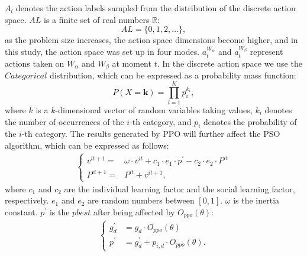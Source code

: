 \documentclass[review]{elsarticle}
\begin{document}
$A_{l}$ denotes the action labels sampled from the distribution of the discrete action space. $AL$ is a finite set of real numbers $\mathbb{R}$:
\begin{equation}
	\label{al}
	AL = \{0, 1, 2, \dots\},
\end{equation}
as the problem size increases, the action space dimensions become higher, and in this study, the action space was set up in four modes. ${a}_{t}^{W_{\alpha}}$ and ${a}_{t}^{W_{\beta}}$ represent actions taken on $W_{\alpha}$ and $W_{\beta}$ at moment $t$. In the discrete action space we use the $Categorical$ distribution, which can be expressed as a probability mass function:
\begin{equation}
	\label{cate}
	P(X = \mathbf{k}) = \prod_{i=1}^{K} p_i^{k_i},
\end{equation}
where $k$ is a $k$-dimensional vector of random variables taking values, $k_{i}$ denotes the number of occurrences of the $i$-th category, and $p_{i}$ denotes the probability of the $i$-th category. The results generated by PPO will further affect the PSO algorithm, which can be expressed as follows:
\begin{align}
	\label{reorg}
	\begin{cases}
		v^{it+1} =& \omega \cdot v^{it} + c_1 \cdot e_1 \cdot p^{\prime} - c_2 \cdot e_2 \cdot P^{it} \\
		P^{it+1} =& P^{it} + v^{it+1},
	\end{cases}
\end{align}
where $c_1$ and $c_2$ are the individual learning factor and the social learning factor, respectively. $e_1$ and $e_2$ are random numbers between $[0, 1]$. $\omega$ is the inertia constant. $p^{\prime}$ is the $pbest$ after being affected by $O_{ppo}(\theta)$:
\begin{align}
	\label{reorg2}
	\begin{cases}
		g_{d}^{\prime} &= g_{d} \cdot O_{ppo}(\theta)\\
		p^{\prime} &= g_{d}^{\prime} + p_{i,d}\cdot O_{ppo}(\theta).
	\end{cases}
\end{align}
\end{document}
